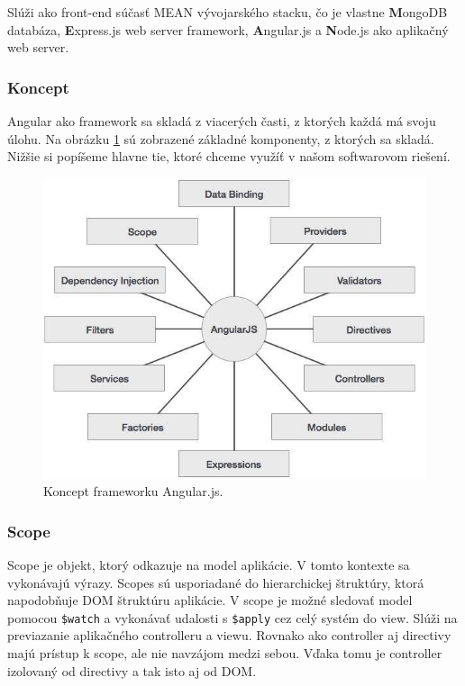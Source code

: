 Slúži ako front-end súčasť MEAN vývojarského stacku, čo je vlastne \textbf{M}ongoDB databáza, \textbf{E}xpress.js web server framework, \textbf{A}ngular.js  a \textbf{N}ode.js ako aplikačný web server.\cite{angular-wiki}\cite{angular-docs}

\subsubsection{Koncept}
Angular ako framework sa skladá z viacerých časti, z ktorých každá má svoju úlohu. Na obrázku \ref{img-angular-concept} sú zobrazené základné komponenty, z ktorých sa skladá. Nižšie si popíšeme hlavne tie, ktoré chceme využíť v našom softwarovom riešení.\cite{angular-concept}

\begin{figure}[H]
  \centering
  \includegraphics[scale=0.5]{img/angular/angularjs_concepts.jpg}
  \caption{Koncept frameworku Angular.js.}
  \label{img-angular-concept}
\end{figure}


\subsubsection{Scope}
Scope je objekt, ktorý odkazuje na model aplikácie. V tomto kontexte sa vykonávajú výrazy. Scopes sú usporiadané do hierarchickej štruktúry, ktorá napodobňuje DOM štruktúru aplikácie. V scope je možné sledovať model pomocou \verb|$watch| a vykonávať udalosti s \verb|$apply| cez celý systém do view. Slúži na previazanie aplikačného controlleru a viewu. Rovnako ako controller aj directivy majú prístup k scope, ale nie navzájom medzi sebou. Vďaka tomu je controller izolovaný od directivy a tak isto aj od DOM.

